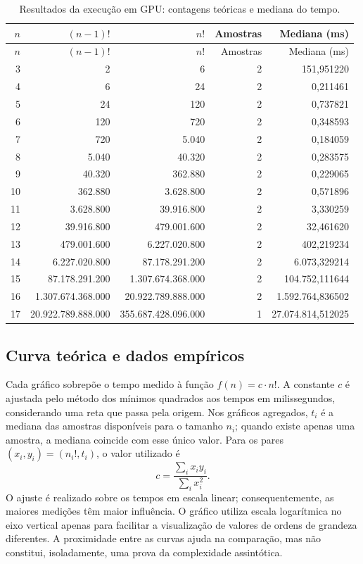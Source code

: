 \documentclass[12pt,a4paper]{article}
\begin{document}
\begin{longtable}{rrrrr}
\caption{Resultados da execução em GPU: contagens teóricas e mediana do tempo.}\label{tab:gpu}\\
\toprule
$n$ & $(n-1)!$ & $n!$ & Amostras & Mediana (ms) \\
\midrule
\endfirsthead
\toprule
$n$ & $(n-1)!$ & $n!$ & Amostras & Mediana (ms) \\
\midrule
\endhead
3 & 2 & 6 & 2 & 151,951220 \\
4 & 6 & 24 & 2 & 0,211461 \\
5 & 24 & 120 & 2 & 0,737821 \\
6 & 120 & 720 & 2 & 0,348593 \\
7 & 720 & 5.040 & 2 & 0,184059 \\
8 & 5.040 & 40.320 & 2 & 0,283575 \\
9 & 40.320 & 362.880 & 2 & 0,229065 \\
10 & 362.880 & 3.628.800 & 2 & 0,571896 \\
11 & 3.628.800 & 39.916.800 & 2 & 3,330259 \\
12 & 39.916.800 & 479.001.600 & 2 & 32,461620 \\
13 & 479.001.600 & 6.227.020.800 & 2 & 402,219234 \\
14 & 6.227.020.800 & 87.178.291.200 & 2 & 6.073,329214 \\
15 & 87.178.291.200 & 1.307.674.368.000 & 2 & 104.752,111644 \\
16 & 1.307.674.368.000 & 20.922.789.888.000 & 2 & 1.592.764,836502 \\
17 & 20.922.789.888.000 & 355.687.428.096.000 & 1 & 27.074.814,512025 \\
\bottomrule
\end{longtable}

\subsection{Curva teórica e dados empíricos}

Cada gráfico sobrepõe o tempo medido à função $f(n)=c\cdot n!$. A constante $c$ é ajustada pelo método dos mínimos quadrados aos tempos em milissegundos, considerando uma reta que passa pela origem. Nos gráficos agregados, $t_i$ é a mediana das amostras disponíveis para o tamanho $n_i$; quando existe apenas uma amostra, a mediana coincide com esse único valor. Para os pares $(x_i,y_i)=(n_i!,t_i)$, o valor utilizado é
\begin{equation}
 c=\frac{\sum_i x_i y_i}{\sum_i x_i^2}.
\end{equation}
O ajuste é realizado sobre os tempos em escala linear; consequentemente, as maiores medições têm maior influência. O gráfico utiliza escala logarítmica no eixo vertical apenas para facilitar a visualização de valores de ordens de grandeza diferentes. A proximidade entre as curvas ajuda na comparação, mas não constitui, isoladamente, uma prova da complexidade assintótica.
\end{document}
